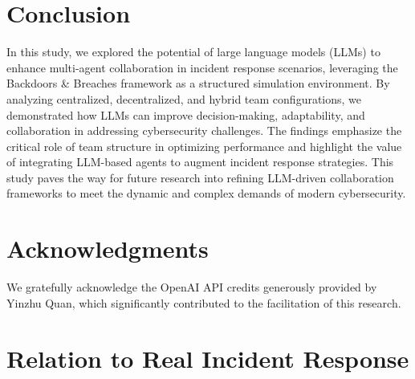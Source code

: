 \documentclass[letterpaper]{article} %
\begin{document}
\section{Conclusion}

In this study, we explored the potential of large language models (LLMs) to enhance multi-agent collaboration in incident response scenarios, leveraging the Backdoors \& Breaches framework as a structured simulation environment. By analyzing centralized, decentralized, and hybrid team configurations, we demonstrated how LLMs can improve decision-making, adaptability, and collaboration in addressing cybersecurity challenges. The findings emphasize the critical role of team structure in optimizing performance and highlight the value of integrating LLM-based agents to augment incident response strategies. This study paves the way for future research into refining LLM-driven collaboration frameworks to meet the dynamic and complex demands of modern cybersecurity.

\section*{Acknowledgments}

We gratefully acknowledge the OpenAI API credits generously provided by Yinzhu Quan, which significantly contributed to the facilitation of this research.


\newpage
\appendix
\section{Relation to Real Incident Response}
\label{sec:relation}
\end{document}
